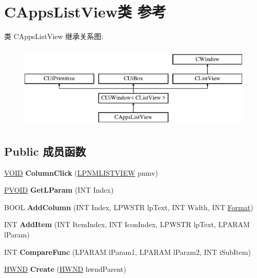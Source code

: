\hypertarget{class_c_apps_list_view}{}\section{C\+Apps\+List\+View类 参考}
\label{class_c_apps_list_view}
类 C\+Apps\+List\+View 继承关系图\+:\begin{figure}[H]
\begin{center}
\leavevmode
\includegraphics[height=4.000000cm]{class_c_apps_list_view}
\end{center}
\end{figure}
\subsection*{Public 成员函数}
\begin{DoxyCompactItemize}
\item 
\mbox{\label{class_c_apps_list_view_a14c766b60be9b7369d056148d7576229}} 
\hyperlink{interfacevoid}{V\+O\+ID} {\bfseries Column\+Click} (\hyperlink{structtag_n_m_l_i_s_t_v_i_e_w}{L\+P\+N\+M\+L\+I\+S\+T\+V\+I\+EW} pnmv)
\item 
\mbox{\label{class_c_apps_list_view_a66d68bed3d4dd76d9eee05e66f11ba13}} 
\hyperlink{interfacevoid}{P\+V\+O\+ID} {\bfseries Get\+L\+Param} (I\+NT Index)
\item 
\mbox{\label{class_c_apps_list_view_ad195504a2ba587f9ab3e0bd8fd189246}} 
B\+O\+OL {\bfseries Add\+Column} (I\+NT Index, L\+P\+W\+S\+TR lp\+Text, I\+NT Width, I\+NT \hyperlink{struct_format}{Format})
\item 
\mbox{\label{class_c_apps_list_view_ac2d8b50aee193e804f9780573eb139a4}} 
I\+NT {\bfseries Add\+Item} (I\+NT Item\+Index, I\+NT Icon\+Index, L\+P\+W\+S\+TR lp\+Text, L\+P\+A\+R\+AM l\+Param)
\item 
\mbox{\label{class_c_apps_list_view_afe73143d4e9ab58ea1a66ccf4116958f}} 
I\+NT {\bfseries Compare\+Func} (L\+P\+A\+R\+AM l\+Param1, L\+P\+A\+R\+AM l\+Param2, I\+NT i\+Sub\+Item)
\item 
\mbox{\label{class_c_apps_list_view_a93bfa369b906d878137a6ec513ebb4ad}} 
\hyperlink{interfacevoid}{H\+W\+ND} {\bfseries Create} (\hyperlink{interfacevoid}{H\+W\+ND} hwnd\+Parent)
\end{DoxyCompactItemize}
